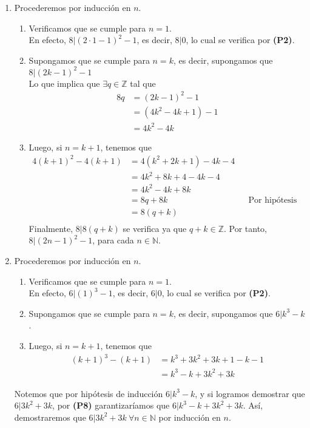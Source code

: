 \documentclass[11pt]{article}
\newcommand{\N}{\mathbb{N}}
\newcommand{\Z}{\mathbb{Z}}
\begin{document}
\begin{enumerate}[label=4.\arabic*]
  \item Procederemos por inducción en $n$.
    \begin{enumerate}[label=\roman*)]
      \item Verificamos que se cumple para $n=1$.\\ En efecto, $8|(2\cdot 1-1)^2-1$, es decir, $8|0$, lo cual se verifica por \textbf{(P2)}.
      \item Supongamos que se cumple para $n=k$, es decir, supongamos que $8|(2k-1)^2-1$ \\ Lo que implica que $\exists q\in \Z$ tal que
      \begin{align*}
        8q &= (2k-1)^2-1 \\
        &= (4k^2-4k+1)-1  \\
        &= 4k^2-4k
      \end{align*}
      \item Luego, si $n=k+1$, tenemos que
      \begin{align*}
        4(k+1)^2-4(k+1) &= 4(k^2+2k+1)-4k-4\\
        &= 4k^2+8k+4-4k-4\\
        &= 4k^2-4k+8k\\
        &= 8q+8k && \text{Por hipótesis de inducción}\\
        &= 8(q+k) \\
      \end{align*}
      Finalmente, $8|8(q+k)$ se verifica ya que $q+k\in \Z$.
      Por tanto, $8|(2n-1)^2-1$, para cada $n\in\N$.
    \end{enumerate}
  \item Procederemos por inducción en $n$.
    \begin{enumerate}[label=\roman*)]
      \item Verificamos que se cumple para $n=1$.\\ En efecto, $6|(1)^3-1$, es decir, $6|0$, lo cual se verifica por \textbf{(P2)}.
      \item Supongamos que se cumple para $n=k$, es decir, supongamos que $6|k^3-k$.
      \item Luego, si $n=k+1$, tenemos que
      \begin{align*}
        (k+1)^3-(k+1) &= k^3+3k^2+3k+1-k-1 \\
        &= k^3-k+3k^2+3k
      \end{align*}
      \end{enumerate}
    Notemos que por hipótesis de inducción $6|k^3-k$, y si logramos demostrar que $6|3k^2+3k$, por \textbf{(P8)} garantizaríamos que $6|k^3-k+3k^2+3k$. Así, demostraremos que $6|3k^2+3k \ \forall n\in \N$ por inducción en $n$.

\end{enumerate}
\end{document}
